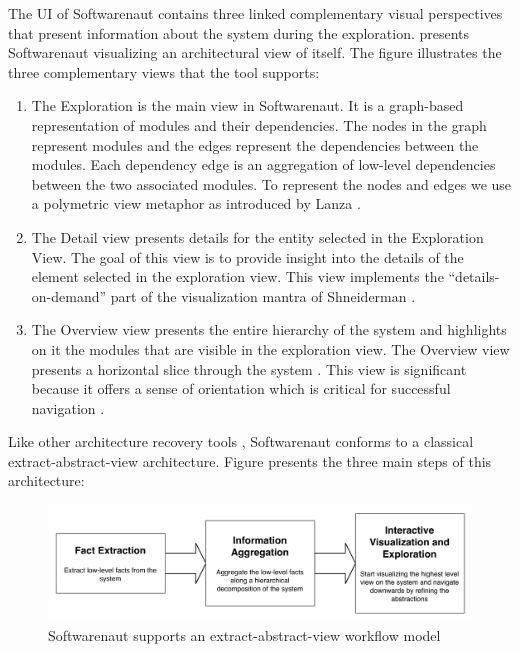 \documentclass[preprint,12pt]{elsarticle}
\begin{document}
The UI of Softwarenaut contains three linked complementary visual perspectives that present information about the system during the exploration.  presents Softwarenaut visualizing an architectural view of itself. The figure illustrates the three complementary views that the tool supports:

\begin{enumerate}
\item The Exploration is the main view in Softwarenaut. It is a graph-based representation of modules and their dependencies. The nodes in the graph represent modules and the edges represent the dependencies between the modules. Each dependency edge is an aggregation of low-level dependencies between the two associated modules. To represent the nodes and edges we use a polymetric view metaphor as introduced by Lanza \cite{lanza-pv, lanza-oomp}. 

\item The Detail view presents details for the entity selected in the Exploration View. The goal of this view is to provide insight into the details of the element selected in the exploration view. This view implements the ``details-on-demand'' part of the visualization mantra of Shneiderman \cite{shneid-eyes}.

\item The Overview view presents the entire hierarchy of the system and highlights on it the modules that are visible in the exploration view. The Overview view presents a horizontal slice through the system \cite{wong-thesis}. %
This view is significant because it offers a sense of orientation which is critical for successful navigation \cite{storey-awareness}.

\end{enumerate}


Like other architecture recovery tools \cite{pollet-sar}, Softwarenaut conforms to a classical extract-abstract-view architecture. Figure  presents the three main steps of this architecture:

\begin{figure}[h]
\begin{center}
\includegraphics[width=\linewidth]{SnautFlow}
\caption{Softwarenaut supports an extract-abstract-view workflow model}
\end{center}
\end{figure}
\end{document}
